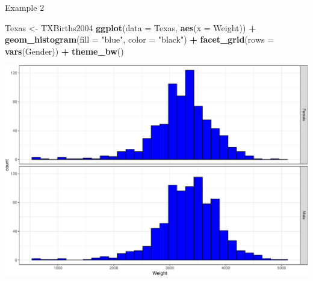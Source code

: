 \documentclass[
  ignorenonframetext,
]{beamer}
\newenvironment{Shaded}{\begin{snugshade}}{\end{snugshade}}
\newcommand{\AttributeTok}[1]{\textcolor[rgb]{0.13,0.29,0.53}{#1}}
\newcommand{\FunctionTok}[1]{\textcolor[rgb]{0.13,0.29,0.53}{\textbf{#1}}}
\newcommand{\NormalTok}[1]{#1}
\newcommand{\OtherTok}[1]{\textcolor[rgb]{0.56,0.35,0.01}{#1}}
\newcommand{\SpecialCharTok}[1]{\textcolor[rgb]{0.81,0.36,0.00}{\textbf{#1}}}
\newcommand{\StringTok}[1]{\textcolor[rgb]{0.31,0.60,0.02}{#1}}
\begin{document}
\begin{frame}[fragile]{Example 2}
\protect\hypertarget{example-2-1}{}
\tiny

\begin{Shaded}
\begin{Highlighting}[]
\NormalTok{Texas }\OtherTok{\textless{}{-}}\NormalTok{ TXBirths2004}
\FunctionTok{ggplot}\NormalTok{(}\AttributeTok{data =}\NormalTok{ Texas, }\FunctionTok{aes}\NormalTok{(}\AttributeTok{x =}\NormalTok{ Weight)) }\SpecialCharTok{+} 
  \FunctionTok{geom\_histogram}\NormalTok{(}\AttributeTok{fill =} \StringTok{"blue"}\NormalTok{, }\AttributeTok{color =} \StringTok{"black"}\NormalTok{) }\SpecialCharTok{+} 
  \FunctionTok{facet\_grid}\NormalTok{(}\AttributeTok{rows =} \FunctionTok{vars}\NormalTok{(Gender)) }\SpecialCharTok{+} 
  \FunctionTok{theme\_bw}\NormalTok{()}
\end{Highlighting}
\end{Shaded}

\begin{center}\includegraphics[width=0.7\linewidth,height=0.5\textheight]{Week11_12_13_files/figure-beamer/unnamed-chunk-6-1} \end{center}
\normalsize
\end{frame}
\end{document}
